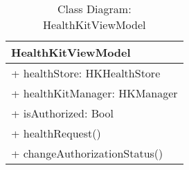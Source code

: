 \begin{table}[H]
\centering
\caption{Class Diagram: HealthKitViewModel}

\hspace{1em}
\renewcommand{\arraystretch}{1.7}

\begin{tabular}{|l|}
\hline
\textbf{HealthKitViewModel} \\
\hline
+ healthStore: HKHealthStore \\
+ healthKitManager: HKManager \\
+ isAuthorized: Bool \\
\hdashline
+ healthRequest() \\
+ changeAuthorizationStatus() \\
\hline
\end{tabular}
\end{table}
